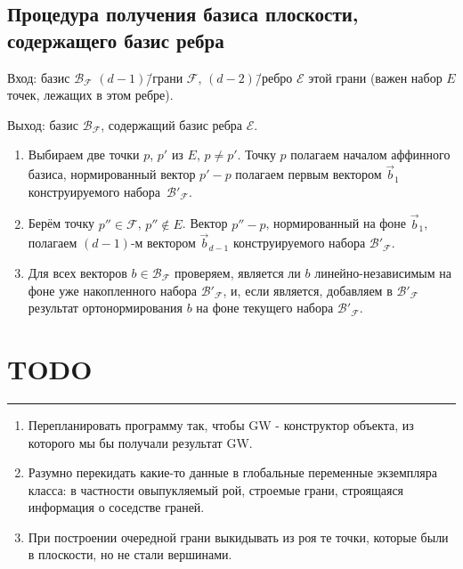 \documentclass[a4paper,12pt]{article}
\newcommand{\Facet}{\mathcal{F}}              %
\newcommand{\Edge}{\mathcal{E}}               %
\newcommand{\Basis}{\mathcal{B}}              %
\renewcommand{\.}{\hspace{0.2ex}}
\begin{document}
  \subsection{Процедура получения базиса плоскости, содержащего базис ребра}
    Вход: базис $\Basis_{\Facet}$ $(d-1)$\=/грани $\Facet$, $(d-2)$\=/ребро $\Edge$ этой грани (важен набор $E$ точек, лежащих в этом ребре).

    Выход: базис $\Basis_{\Facet}$, содержащий базис ребра $\Edge$.
    \begin{enumerate}
      \item Выбираем две точки $p$, $p'$ из $E$, $p \neq p'$. Точку $p$ полагаем началом аффинного базиса, нормированный вектор $p'-p$ полагаем первым вектором $\vec b_1$ конструируемого набора~$\Basis'_{\Facet}$.
      \item Берём точку $p'' \in \Facet$, $p'' \notin E$. Вектор $p''-p$, нормированный на фоне $\vec b_1$, полагаем $(d-1)$-м вектором $\vec b_{d-1}$ конструируемого набора $\Basis'_{\Facet}$.
      \item Для всех векторов $b \in \Basis_{\Facet}$ проверяем, является ли $b$ линейно-независимым на фоне уже накопленного набора $\Basis'_{\Facet}$, и, если является, добавляем в $\Basis'_{\Facet}$ результат ортонормирования $b$ на фоне текущего набора $\Basis'_{\Facet}$.
    \end{enumerate}


\section{TODO}

  \hrule

  \bigskip

  \begin{enumerate}
      \item Перепланировать программу так, чтобы GW - конструктор объекта, из которого мы бы получали результат GW.

      \item Разумно перекидать какие-то данные в глобальные переменные экземпляра класса: в частности овыпукляемый рой, строемые грани, строящаяся информация о соседстве граней.

    \item При построении очередной грани выкидывать из роя те точки, которые были в плоскости, но не стали вершинами.
  \end{enumerate}
\end{document}
